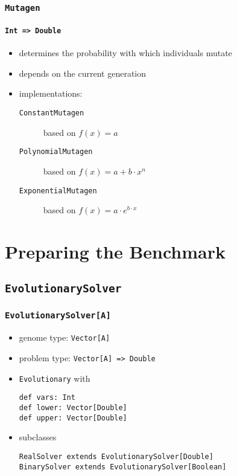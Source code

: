 \documentclass[compress,xcolor=table]{beamer}
\begin{document}
\begin{frame}
  \frametitle{\texttt{Mutagen}}
  \framesubtitle{\texttt{Int => Double}}
  \begin{itemize}
    \item determines the probability with which individuals mutate
    \item depends on the current generation
    \item implementations:
    \begin{description}
      \item[\texttt{ConstantMutagen}] $~$ \\ based on $f(x) = a$
      \item[\texttt{PolynomialMutagen}] $~$ \\ based on $f(x) = a + b \cdot x^n$
      \item[\texttt{ExponentialMutagen}] $~$ \\ based on $f(x) = a \cdot e^{b \cdot x}$
    \end{description}
  \end{itemize}
\end{frame}


\section{Preparing the Benchmark}

\subsection{\texttt{EvolutionarySolver}}

\begin{frame}
  \frametitle{\texttt{EvolutionarySolver[A]}}
  \begin{itemize}
    \item genome type: \texttt{Vector[A]}
    \item problem type: \texttt{Vector[A] => Double}
    \item \texttt{Evolutionary} with
    \begin{description}
      \item[\texttt{def vars: Int}]
      \item[\texttt{def lower: Vector[Double]}]
      \item[\texttt{def upper: Vector[Double]}]
    \end{description}
    \item subclasses
    \begin{description}
      \item[\texttt{RealSolver extends EvolutionarySolver[Double]}]
      \item[\texttt{BinarySolver extends EvolutionarySolver[Boolean]}]
    \end{description}
  \end{itemize}
\end{frame}
\end{document}
